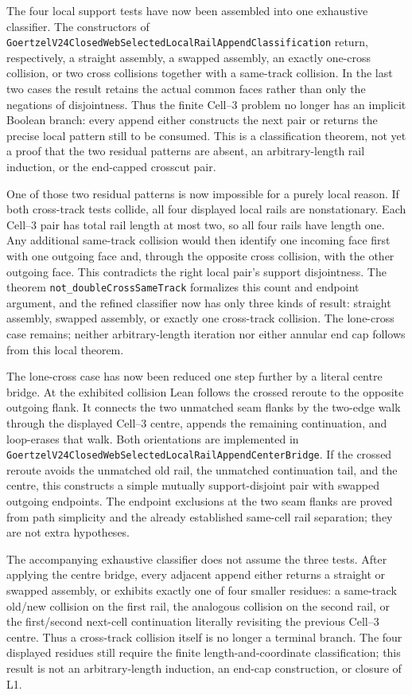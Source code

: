 \documentclass[11pt]{article}
\theoremstyle{definition}
\begin{document}
The four local support tests have now been assembled into one exhaustive
classifier.  The constructors of
\texttt{GoertzelV24ClosedWebSelectedLocalRailAppendClassification} return,
respectively, a straight assembly, a swapped assembly, an exactly one-cross
collision, or two cross collisions together with a same-track collision.  In
the last two cases the result retains the actual common faces rather than only
the negations of disjointness.  Thus the finite Cell--3 problem no longer has
an implicit Boolean branch: every append either constructs the next pair or
returns the precise local pattern still to be consumed.  This is a
classification theorem, not yet a proof that the two residual patterns are
absent, an arbitrary-length rail induction, or the end-capped crosscut pair.

One of those two residual patterns is now impossible for a purely local
reason.  If both cross-track tests collide, all four displayed local rails are
nonstationary.  Each Cell--3 pair has total rail length at most two, so all
four rails have length one.  Any additional same-track collision would then
identify one incoming face first with one outgoing face and, through the
opposite cross collision, with the other outgoing face.  This contradicts the
right local pair's support disjointness.  The theorem
\texttt{not\_doubleCrossSameTrack} formalizes this count and endpoint
argument, and the refined classifier now has only three kinds of result:
straight assembly, swapped assembly, or exactly one cross-track collision.
The lone-cross case remains; neither arbitrary-length iteration nor either
annular end cap follows from this local theorem.

The lone-cross case has now been reduced one step further by a literal
centre bridge.  At the exhibited collision Lean follows the crossed reroute
to the opposite outgoing flank.  It connects the two unmatched seam flanks
by the two-edge walk through the displayed Cell--3 centre, appends the
remaining continuation, and loop-erases that walk.  Both orientations are
implemented in
\texttt{GoertzelV24ClosedWebSelectedLocalRailAppendCenterBridge}.  If the
crossed reroute avoids the unmatched old rail, the unmatched continuation
tail, and the centre, this constructs a simple mutually support-disjoint pair
with swapped outgoing endpoints.  The endpoint exclusions at the two seam
flanks are proved from path simplicity and the already established same-cell
rail separation; they are not extra hypotheses.

The accompanying exhaustive classifier does not assume the three tests.
After applying the centre bridge, every adjacent append either returns a
straight or swapped assembly, or exhibits exactly one of four smaller
residues: a same-track old/new collision on the first rail, the analogous
collision on the second rail, or the first/second next-cell continuation
literally revisiting the previous Cell--3 centre.  Thus a cross-track
collision itself is no longer a terminal branch.  The four displayed
residues still require the finite length-and-coordinate classification; this
result is not an arbitrary-length induction, an end-cap construction, or
closure of L1.
\end{document}
